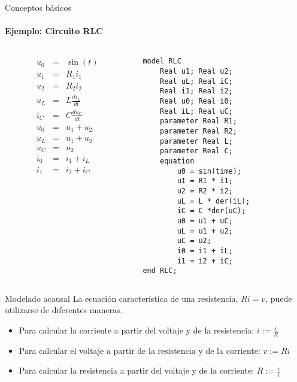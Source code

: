 \begin{frame}[fragile]{Conceptos básicos}
   \framesubtitle{Ejemplo: Circuito RLC}
   \fontsize{8pt}{7.2}\selectfont
    \begin{columns}
        \begin{column}{0.4\textwidth}
            \begin{eqnarray*}
            u_{0} & = & \sin\left(t\right)\\
            u_{1} & = & R_{1}i_{1}\\
            u_{2} & = & R_{2}i_{2}\\
            u_{L} & = & L\frac{di_{L}}{dt}\\
            i_{C} & = & C\frac{du_{C}}{dt}\\
            u_{0} & = & u_{1}+u_{2}\\
            u_{L} & = & u_{1}+u_{2}\\
            u_{C} & = & u_{2}\\
            i_{0} & = & i_{1}+i_{L}\\
            i_{1} & = & i_{2}+i_{C}
            \end{eqnarray*}
        \end{column}
        \begin{column}{0.6\textwidth}
            \begin{lstlisting}[language=Modelica]
model RLC
    Real u1; Real u2;
    Real uL; Real iC;
    Real i1; Real i2;
    Real u0; Real i0;
    Real iL; Real uC;
    parameter Real R1;
    parameter Real R2;
    parameter Real L;
    parameter Real C;
    equation
        u0 = sin(time);
        u1 = R1 * i1;
        u2 = R2 * i2;
        uL = L * der(iL);
        iC = C *der(uC);
        u0 = u1 + uC;
        uL = u1 + u2;
        uC = u2;
        i0 = i1 + iL;
        i1 = i2 + iC;
end RLC;
            \end{lstlisting}
        \end{column}
    \end{columns}
\end{frame}

\begin{frame}[fragile]{Modelado acausal}
    La ecuación característica de una resistencia, $Ri=v$, puede utilizarse de diferentes maneras.
    \pause
    \begin{itemize}
        \item<2-> Para calcular la corriente a partir del voltaje y de la resistencia: $i :=\frac{v}{R}$
        \item<3-> Para calcular el voltaje a partir de la resistencia
y de la corriente: $v :=Ri$
        \item<4-> Para calcular la resistencia a partir del voltaje y
de la corriente: $R :=\frac{v}{i}$
    \end{itemize}
\end{frame}
